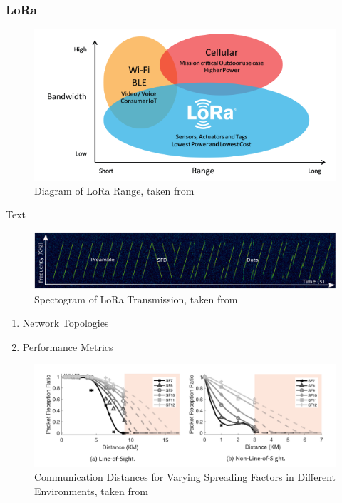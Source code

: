 \documentclass[a4paper,twoside,12pt]{report}
\begin{document}
\subsubsection{LoRa}

\begin{figure}[ht]
	\centering
	\includegraphics[width=0.5\linewidth]{images/LoRa_Why_Range.png}
	\caption{Diagram of LoRa Range, taken from \cite{Semtech_2023}}
	\label{fig:LoRaRange}
\end{figure}

Text 

\begin{figure}[ht]
	\centering
	\includegraphics[width=0.8\linewidth]{images/LoRa transmission spectogram.png}
	\caption{Spectogram of LoRa Transmission, taken from \cite{Liando2019KnownStudy}}
	\label{fig:LoRaTransmissionSpectogram}
\end{figure}


\begin{enumerate}
    \item Network Topologies
    \item Performance Metrics
\end{enumerate}

\begin{figure}[ht]
	\centering
	\includegraphics[width=0.8\linewidth]{images/LoRa_propagation_line_of_sight.png}
	\caption{Communication Distances for Varying Spreading Factors in Different Environments, taken from \cite{Liando2019KnownStudy}}
	\label{fig:LoRaTransmissionSpectogram}
\end{figure}
\end{document}

